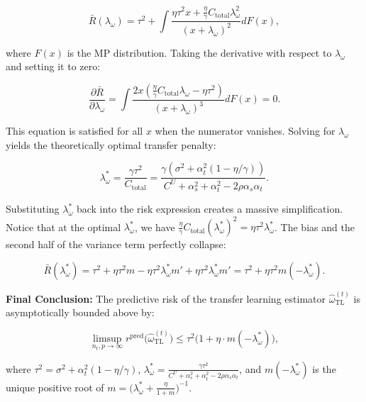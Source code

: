 \documentclass{article}
\begin{document}
\[
\bar{R}(\lambda_\omega) = \tau^2 + \int \frac{\eta \tau^2 x + \frac{\eta}{\gamma} C_{\mathrm{total}} \lambda_\omega^2}{(x + \lambda_\omega)^2} dF(x),
\]

where $F(x)$ is the MP distribution. Taking the derivative with respect to $\lambda_\omega$ and setting it to zero:

\[
\frac{\partial \bar{R}}{\partial \lambda_\omega} = \int \frac{2x \left(\frac{\eta}{\gamma} C_{\mathrm{total}} \lambda_\omega - \eta \tau^2\right)}{(x + \lambda_\omega)^3} dF(x) = 0.
\]

This equation is satisfied for all $x$ when the numerator vanishes. Solving for $\lambda_\omega$ yields the theoretically optimal transfer penalty:

\[
\lambda_\omega^* = \frac{\gamma \tau^2}{C_{\mathrm{total}}} = \frac{\gamma \left(\sigma^2 + \alpha_t^2(1 - \eta/\gamma)\right)}{C^U + \alpha_s^2 + \alpha_t^2 - 2\rho\alpha_s\alpha_t}.
\]

Substituting $\lambda_\omega^*$ back into the risk expression creates a massive simplification. Notice that at the optimal $\lambda_\omega^*$, we have $\frac{\eta}{\gamma} C_{\mathrm{total}} (\lambda_\omega^*)^2 = \eta \tau^2 \lambda_\omega^*$. The bias and the second half of the variance term perfectly collapse:

\[
\bar{R}(\lambda_\omega^*) = \tau^2 + \eta \tau^2 m - \eta \tau^2 \lambda_\omega^* m' + \eta \tau^2 \lambda_\omega^* m' = \tau^2 + \eta \tau^2 m(-\lambda_\omega^*).
\]

\textbf{Final Conclusion:}
The predictive risk of the transfer learning estimator $\hat\omega_{\mathrm{TL}}^{(t)}$ is asymptotically bounded above by:

\[
\limsup_{n_t, p \to \infty} r^{\mathrm{pred}}\!\bigl(\hat\omega_{\mathrm{TL}}^{(t)}\bigr) \le \tau^2 \bigl(1 + \eta \cdot m(-\lambda_\omega^*)\bigr),
\]

where $\tau^2 = \sigma^2 + \alpha_t^2(1 - \eta/\gamma)$, $\lambda_\omega^* = \frac{\gamma \tau^2}{C^U + \alpha_s^2 + \alpha_t^2 - 2\rho\alpha_s\alpha_t}$, and $m(-\lambda_\omega^*)$ is the unique positive root of $m = \bigl(\lambda_\omega^* + \frac{\eta}{1+m}\bigr)^{-1}$. \qedsymbol
\end{document}
